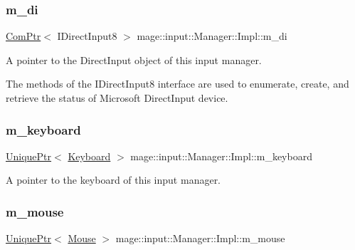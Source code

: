\subsubsection{\texorpdfstring{m\+\_\+di}{m\_di}}
{\footnotesize\ttfamily \mbox{\hyperlink{namespacemage_ae74f374780900893caa5555d1031fd79}{Com\+Ptr}}$<$ I\+Direct\+Input8 $>$ mage\+::input\+::\+Manager\+::\+Impl\+::m\+\_\+di\hspace{0.3cm}{\ttfamily [private]}}

A pointer to the Direct\+Input object of this input manager.

The methods of the I\+Direct\+Input8 interface are used to enumerate, create, and retrieve the status of Microsoft Direct\+Input device. \mbox{\label{classmage_1_1input_1_1_manager_1_1_impl_a2b41f999b73742a6c3cb7ba9e86aee9e}} 
\subsubsection{\texorpdfstring{m\+\_\+keyboard}{m\_keyboard}}
{\footnotesize\ttfamily \mbox{\hyperlink{namespacemage_a3316d7143a973e37adf1110f2e80ca31}{Unique\+Ptr}}$<$ \mbox{\hyperlink{classmage_1_1input_1_1_keyboard}{Keyboard}} $>$ mage\+::input\+::\+Manager\+::\+Impl\+::m\+\_\+keyboard\hspace{0.3cm}{\ttfamily [private]}}

A pointer to the keyboard of this input manager. \mbox{\label{classmage_1_1input_1_1_manager_1_1_impl_aeae8977636864dddcbcdb69ecefca133}} 
\subsubsection{\texorpdfstring{m\+\_\+mouse}{m\_mouse}}
{\footnotesize\ttfamily \mbox{\hyperlink{namespacemage_a3316d7143a973e37adf1110f2e80ca31}{Unique\+Ptr}}$<$ \mbox{\hyperlink{classmage_1_1input_1_1_mouse}{Mouse}} $>$ mage\+::input\+::\+Manager\+::\+Impl\+::m\+\_\+mouse\hspace{0.3cm}{\ttfamily [private]}}

